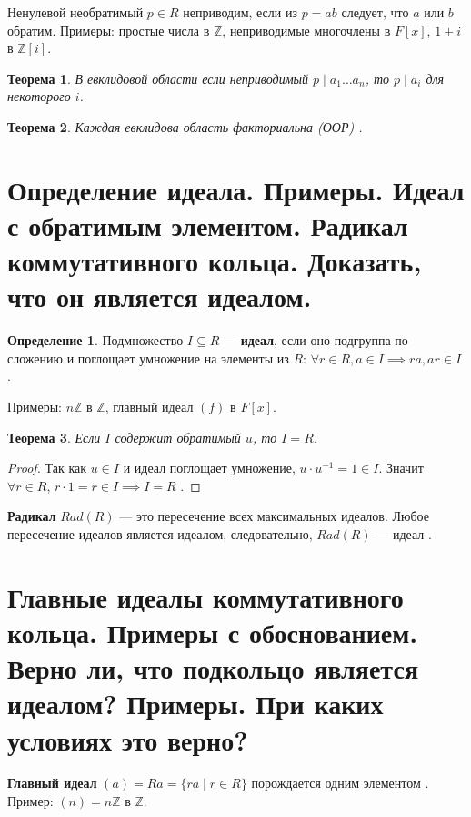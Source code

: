 \documentclass[12pt, a4paper]{article}
\theoremstyle{definition}
\newtheorem{definition}{Определение}[section]
\theoremstyle{plain}
\newtheorem{theorem}{Теорема}[section]
\begin{document}
	Ненулевой необратимый $p \in R$ неприводим, если из $p=ab$ следует, что $a$ или $b$ обратим. Примеры: простые числа в $\mathbb{Z}$, неприводимые многочлены в $F[x]$, $1+i$ в $\mathbb{Z}[i]$.
	
	\begin{theorem}
		В евклидовой области если неприводимый $p \mid a_1 \dots a_n$, то $p \mid a_i$ для некоторого $i$.
	\end{theorem}
	\begin{theorem}
		Каждая евклидова область факториальна (ООР) .
	\end{theorem}
	
	\newpage
	
	\section{Определение идеала. Примеры. Идеал с обратимым элементом. Радикал коммутативного кольца. Доказать, что он является идеалом.}
	
	\begin{definition}
		Подмножество $I \subseteq R$ — \textbf{идеал}, если оно подгруппа по сложению и поглощает умножение на элементы из $R$: $\forall r \in R, a \in I \implies ra, ar \in I$ .
	\end{definition}
	
	Примеры: $n\mathbb{Z}$ в $\mathbb{Z}$, главный идеал $(f)$ в $F[x]$.
	
	\begin{theorem}
		Если $I$ содержит обратимый $u$, то $I=R$.
	\end{theorem}
	\begin{proof}
		Так как $u \in I$ и идеал поглощает умножение, $u \cdot u^{-1} = 1 \in I$. Значит $\forall r \in R$, $r \cdot 1 = r \in I \implies I=R$ .
	\end{proof}
	
	\textbf{Радикал} $Rad(R)$ — это пересечение всех максимальных идеалов. Любое пересечение идеалов является идеалом, следовательно, $Rad(R)$ — идеал .
	
	\newpage
	
	\section{Главные идеалы коммутативного кольца. Примеры с обоснованием. Верно ли, что подкольцо является идеалом? Примеры. При каких условиях это верно?}
	
	\textbf{Главный идеал} $(a) = Ra = \{ra \mid r \in R\}$ порождается одним элементом . Пример: $(n) = n\mathbb{Z}$ в $\mathbb{Z}$.
	
\end{document}
